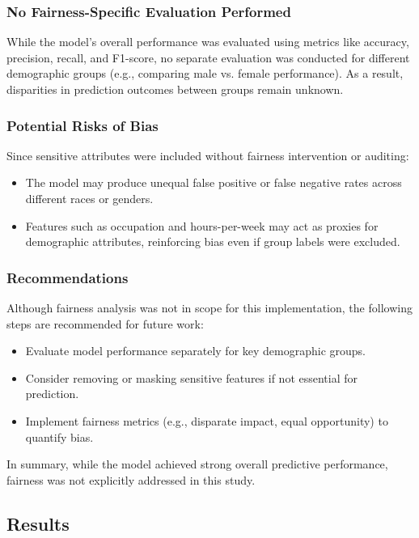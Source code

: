 \documentclass[a4paper,12pt]{article}
\begin{document}
\subsubsection*{No Fairness-Specific Evaluation Performed}

While the model's overall performance was evaluated using metrics like accuracy, precision, recall, and F1-score, no separate evaluation was conducted for different demographic groups (e.g., comparing male vs. female performance). As a result, disparities in prediction outcomes between groups remain unknown.

\subsubsection*{Potential Risks of Bias}

Since sensitive attributes were included without fairness intervention or auditing:
\begin{itemize}
    \item The model may produce unequal false positive or false negative rates across different races or genders.
    \item Features such as occupation and hours-per-week may act as proxies for demographic attributes, reinforcing bias even if group labels were excluded.
\end{itemize}

\subsubsection*{Recommendations}

Although fairness analysis was not in scope for this implementation, the following steps are recommended for future work:
\begin{itemize}
    \item Evaluate model performance separately for key demographic groups.
    \item Consider removing or masking sensitive features if not essential for prediction.
    \item Implement fairness metrics (e.g., disparate impact, equal opportunity) to quantify bias.
\end{itemize}

In summary, while the model achieved strong overall predictive performance, fairness was not explicitly addressed in this study.

\subsection{Results}
\end{document}

